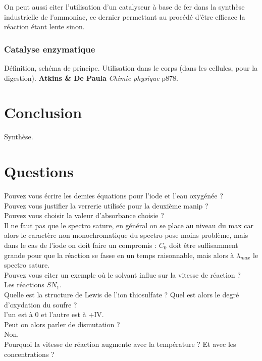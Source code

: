 \documentclass[12pt,prb,aps,epsf]{article}
\begin{document}
On peut aussi citer l'utilisation d'un catalyseur à base de fer dans la synthèse industrielle de l'ammoniac, ce dernier permettant au procédé d'être efficace la réaction étant lente sinon.

\subsubsection{Catalyse enzymatique}
Définition, schéma de principe. Utilisation dans le corps (dans les cellules, pour la digestion). \textbf{Atkins \& De Paula} \textit{Chimie physique} p878.

\section{Conclusion}
Synthèse.

\section*{Questions}
Pouvez vous écrire les demies équations pour l'iode et l'eau oxygénée ?\\

Pouvez vous justifier la verrerie utilisée pour la deuxième manip ?\\

Pouvez vous choisir la valeur d'absorbance choisie ?\\
Il ne faut pas que le spectro sature, en général on se place au niveau du max car alors le caractère non monochromatique du spectro pose moins problème, mais dans le cas de l'iode on doit faire un compromis : $C_0$ doit être suffisamment grande pour que la réaction se fasse en un temps raisonnable, mais alors à $\lambda_{max}$ le spectro sature.\\

Pouvez vous citer un exemple où le solvant influe sur la vitesse de réaction ?\\
Les réactions $SN_1$.\\

Quelle est la structure de Lewis de l'ion thiosulfate ? Quel est alors le degré d'oxydation du soufre ?\\
l'un est à 0 et l'autre est à +IV.\\

Peut on alors parler de dismutation ?\\
Non.\\

Pourquoi la vitesse de réaction augmente avec la température ? Et avec les concentrations ?\\
\end{document}
